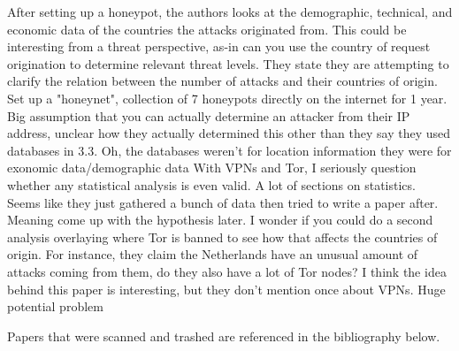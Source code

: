 \documentclass[conference]{IEEEtran}
\begin{document}
After setting up a honeypot, the authors looks at the demographic, technical, and economic data of the countries the attacks originated from. This could be interesting from a threat perspective, as-in can you use the country of request origination to determine relevant threat levels.
They state they are attempting to clarify the relation between the number of attacks and their countries of origin. 
Set up a "honeynet", collection of 7 honeypots directly on the internet for 1 year.
Big assumption that you can actually determine an attacker from their IP address, unclear how they actually determined this other than they say they used databases in 3.3. 
Oh, the databases weren't for location information they were for exonomic data/demographic data
With VPNs and Tor, I seriously question whether any statistical analysis is even valid.
A lot of sections on statistics.
Seems like they just gathered a bunch of data then tried to write a paper after.
Meaning come up with the hypothesis later.
I wonder if you could do a second analysis overlaying where Tor is banned to see how that affects the countries of origin.
For instance, they claim the Netherlands have an unusual amount of attacks coming from them, do they also have a lot of Tor nodes?
I think the idea behind this paper is interesting, but they don't mention once about VPNs. 
Huge potential problem

Papers that were scanned and trashed are referenced in the bibliography below. 
\nocite{*}



\end{document}
